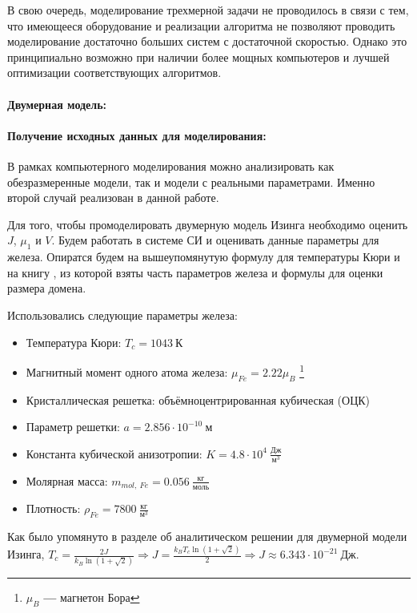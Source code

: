 \documentclass[oneside,final,14pt]{extarticle}
\begin{document}
	В свою очередь, моделирование трехмерной задачи не проводилось в связи с тем, что имеющееся оборудование и реализации алгоритма не позволяют проводить моделирование достаточно больших систем с достаточной скоростью. Однако это принципиально возможно при наличии более мощных компьютеров и лучшей оптимизации соответствующих алгоритмов. 
	\paragraph{Двумерная модель:}
	\paragraph{Получение исходных данных для моделирования:}	
	В рамках компьютерного моделирования можно анализировать как обезразмеренные модели, так и модели с реальными параметрами. Именно второй случай реализован в данной работе.

	Для того, чтобы промоделировать двумерную модель Изинга необходимо оценить $J$, $\mu_{1}$ и $V$. Будем работать в системе СИ и оценивать данные параметры для железа. Опиратся будем на вышеупомянутую формулу для температуры Кюри и на книгу \cite{magn}, из которой взяты часть параметров железа и формулы для оценки размера домена.

	Использовались следующие параметры железа: 
	\begin{itemize}
	\item Температура Кюри: $T_c=1043 \ \text{К}$
	\item Магнитный момент одного атома железа: $\mu_{Fe}=2.22\mu_{B}$ \footnote{$\mu_{B}$ \textbf{---} магнетон Бора}
	\item Кристаллическая решетка: объёмноцентрированная кубическая (ОЦК)
	\item Параметр решетки: $a=2.856 \cdot 10^{-10} \ \text{м}$
	\item Константа кубической анизотропии: $K=4.8 \cdot 10^{4} \ \frac{\text{Дж}}{\text{м}^3}$
	\item Молярная масса: $m_{mol, \ Fe}=0.056 \ \frac{\text{кг}}{\text{моль}}$
	\item Плотность: $\rho_{Fe}=7800 \ \frac{\text{кг}}{\text{м}^3}$
	\end{itemize}
	
	Как было упомянуто в разделе об аналитическом решении для двумерной модели Изинга, $T_{c}=\frac{2J}{k_{B}\ln(1+\sqrt{2})} \Rightarrow J=\frac{k_{B}T_{c}\ln(1+\sqrt{2})}{2} \Rightarrow \boxed{J \approx 6.343 \cdot 10^{-21} \ \text{Дж}}$.
\end{document}
